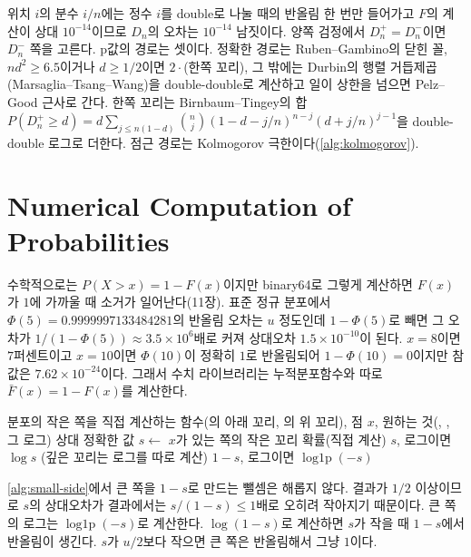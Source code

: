 위치 $i$의 분수 $i/n$에는 정수 $i$를 double로 나눌 때의 반올림 한 번만 들어가고 $F$의 계산이 상대 $10^{-14}$이므로 $D_n$의 오차는 $10^{-14}$ 남짓이다. 양쪽 검정에서 $D_n^+=D_n^-$이면 $D_n^-$ 쪽을 고른다. p값의 경로는 셋이다. 정확한 경로는 Ruben--Gambino의 닫힌 꼴, $nd^2\ge6.5$이거나 $d\ge1/2$이면 $2\cdot$(한쪽 꼬리), 그 밖에는 Durbin의 행렬 거듭제곱(Marsaglia--Tsang--Wang)을 double-double로 계산하고 일이 상한을 넘으면 Pelz--Good 근사로 간다. 한쪽 꼬리는 Birnbaum--Tingey의 합 $P(D_n^+\ge d)=d\sum_{j\le n(1-d)}\binom nj(1-d-j/n)^{n-j}(d+j/n)^{j-1}$을 double-double 로그로 더한다. 점근 경로는 Kolmogorov 극한이다(\cref{alg:kolmogorov}).

\section{Numerical Computation of Probabilities}
\label{sec:probability-numerics}

수학적으로는 $P(X>x)=1-F(x)$이지만 binary64로 그렇게 계산하면 $F(x)$가 $1$에 가까울 때 소거가 일어난다(11장). 표준 정규 분포에서 $\Phi(5)=0.9999997133484281$의 반올림 오차는 $u$ 정도인데 $1-\Phi(5)$로 빼면 그 오차가 $1/(1-\Phi(5))\approx3.5\times10^6$배로 커져 상대오차 $1.5\times10^{-10}$이 된다. $x=8$이면 $7$퍼센트이고 $x=10$이면 $\Phi(10)$이 정확히 $1$로 반올림되어 $1-\Phi(10)=0$이지만 참값은 $7.62\times10^{-24}$이다. 그래서 수치 라이브러리는 누적분포함수와 따로  $\bar F(x)=1-F(x)$를 계산한다.

\begin{algorithm}[htbp]
\begin{algorithmic}[1]
\Require 분포의 작은 쪽을 직접 계산하는 함수(의 아래 꼬리, 의 위 꼬리), 점 $x$, 원하는 것(, , 그 로그)
\Ensure 상대 정확한 값
\State $s\gets$ $x$가 있는 쪽의 작은 꼬리 확률(직접 계산) 
 \Return $s$, 로그이면 $\log s$ (깊은 꼬리는 로그를 따로 계산)
\Else {}
  \State \Return $1-s$, 로그이면 $\operatorname{log1p}(-s)$
\EndIf
\end{algorithmic}
\caption{작은 쪽 규칙 (stardust 분포 객체의 , , , )}
\label{alg:small-side}
\end{algorithm}

\cref{alg:small-side}에서 큰 쪽을 $1-s$로 만드는 뺄셈은 해롭지 않다. 결과가 $1/2$ 이상이므로 $s$의 상대오차가 결과에서는 $s/(1-s)\le1$배로 오히려 작아지기 때문이다. 큰 쪽의 로그는 $\operatorname{log1p}(-s)$로 계산한다. $\log(1-s)$로 계산하면 $s$가 작을 때 $1-s$에서 반올림이 생긴다. $s$가 $u/2$보다 작으면 큰 쪽은 반올림해서 그냥 $1$이다.

